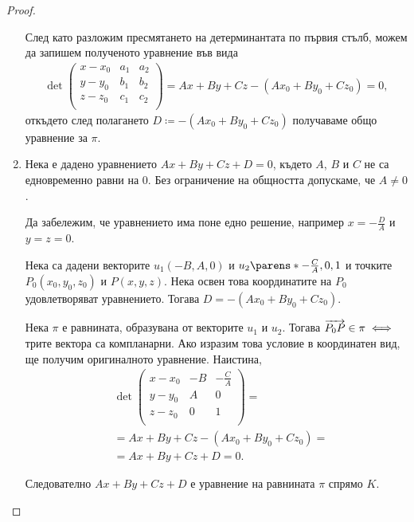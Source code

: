 \documentclass{../../common/topic}
\begin{document}
\begin{proof}
\begin{enumerate}
    След като разложим пресмятането на детерминантата по първия стълб, можем да запишем полученото уравнение във вида
    \begin{align*}
      \det \begin{pmatrix}
        x - x_0 & a_1 & a_2 \\
        y - y_0 & b_1 & b_2 \\
        z - z_0 & c_1 & c_2 \\
      \end{pmatrix}
      =
      Ax + By + Cz - (Ax_0 + By_0 + Cz_0) = 0,
    \end{align*}
    откъдето след полагането \( D \coloneqq - (Ax_0 + By_0 + Cz_0) \) получаваме общо уравнение за \( \pi \).

    \item Нека е дадено уравнението \( Ax + By + Cz + D = 0 \), където \( A \), \( B \) и \( C \) не са едновременно равни на \( 0 \). Без ограничение на общността допускаме, че \( A \neq 0 \).

    Да забележим, че уравнението има поне едно решение, например \( x = -\frac D A \) и \( y = z = 0 \).

    Нека са дадени векторите \( u_1(-B, A, 0) \) и \( u_2 \parens*{-\frac C A, 0, 1 } \) и точките \( P_0(x_0, y_0, z_0) \) и \( P(x, y, z) \). Нека освен това координатите на \( P_0 \) удовлетворяват уравнението. Тогава \( D = -(Ax_0 + By_0 + Cz_0) \).

    Нека \( \pi \) е равнината, образувана от векторите \( u_1 \) и \( u_2 \). Тогава \( \overrightarrow{P_0 P} \in \pi \iff \) трите вектора са компланарни. Ако изразим това условие в координатен вид, ще получим оригиналното уравнение. Наистина,
    \begin{align*}
      &\det \begin{pmatrix}
        x - x_0 & -B & -\frac C A \\
        y - y_0 & A & 0 \\
        z - z_0 & 0 & 1 \\
      \end{pmatrix}
      = \\ &=
      Ax + By + Cz - (Ax_0 + By_0 + Cz_0)
      = \\ &=
      Ax + By + Cz + D = 0.
    \end{align*}

    Следователно \( Ax + By + Cz + D \) е уравнение на равнината \( \pi \) спрямо \( K \).
  \end{enumerate}
\end{proof}
\end{document}
